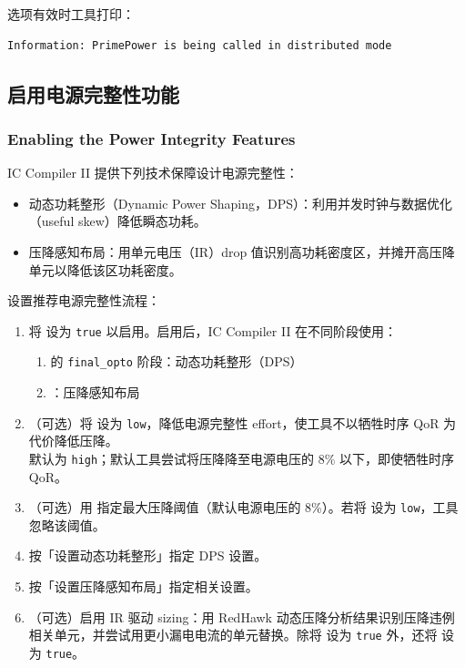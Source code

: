 选项有效时工具打印：
\begin{lstlisting}
Information: PrimePower is being called in distributed mode
\end{lstlisting}

\subsection{启用电源完整性功能}
\subsubsection*{Enabling the Power Integrity Features}

IC Compiler II 提供下列技术保障设计电源完整性：
\begin{itemize}
  \item 动态功耗整形（Dynamic Power Shaping，DPS）：利用并发时钟与数据优化（useful skew）降低瞬态功耗。
  \item 压降感知布局：用单元电压（IR）drop 值识别高功耗密度区，并摊开高压降单元以降低该区功耗密度。
\end{itemize}

设置推荐电源完整性流程：
\begin{enumerate}
  \item 将  设为 \texttt{true} 以启用。启用后，IC Compiler II 在不同阶段使用：
        \begin{enumerate}
          \item {} 的 \texttt{final\_opto} 阶段：动态功耗整形（DPS）
          \item {}：压降感知布局
        \end{enumerate}
  \item （可选）将  设为 \texttt{low}，降低电源完整性 effort，使工具不以牺牲时序 QoR 为代价降低压降。\\
        默认为 \texttt{high}；默认工具尝试将压降降至电源电压的 8\% 以下，即使牺牲时序 QoR。
  \item （可选）用  指定最大压降阈值（默认电源电压的 8\%）。若将  设为 \texttt{low}，工具忽略该阈值。
  \item 按「设置动态功耗整形」指定 DPS 设置。
  \item 按「设置压降感知布局」指定相关设置。
  \item （可选）启用 IR 驱动 sizing：用 RedHawk 动态压降分析结果识别压降违例相关单元，并尝试用更小漏电电流的单元替换。除将  设为 \texttt{true} 外，还将  设为 \texttt{true}。
\end{enumerate}

